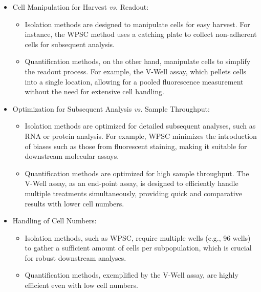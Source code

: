 \begin{itemize}
    \item Cell Manipulation for Harvest \textit{vs.} Readout:
          \begin{itemize}
              \item Isolation methods are designed to manipulate cells for easy
                    harvest. For instance, the \ac{WPSC} method uses a catching
                    plate to collect non-adherent cells for subsequent analysis.
              \item Quantification methods, on the other hand, manipulate cells
                    to simplify the readout process. For example, the V-Well
                    assay, which pellets cells into a single location, allowing
                    for a pooled fluorescence measurement without the need for
                    extensive cell handling.
          \end{itemize}

    \item Optimization for Subsequent Analysis \textit{vs.} Sample Throughput:
          \begin{itemize}
              \item Isolation methods are optimized for detailed subsequent
                    analyses, such as RNA or protein analysis. For example,
                    \ac{WPSC} minimizes the introduction of biases such as those
                    from fluorescent staining, making it suitable for downstream
                    molecular assays.
              \item Quantification methods are optimized for high sample
                    throughput. The V-Well assay, as an end-point assay, is
                    designed to efficiently handle multiple treatments
                    simultaneously, providing quick and comparative results with
                    lower cell numbers.
          \end{itemize}
    \item Handling of Cell Numbers:
          \begin{itemize}
              \item Isolation methods, such as \ac{WPSC}, require multiple wells
                    (e.g., 96 wells) to gather a sufficient amount of cells per
                    subpopulation, which is crucial for robust downstream
                    analyses.
              \item Quantification methods, exemplified by the V-Well assay, are
                    highly efficient even with low cell numbers.
          \end{itemize}
\end{itemize}



